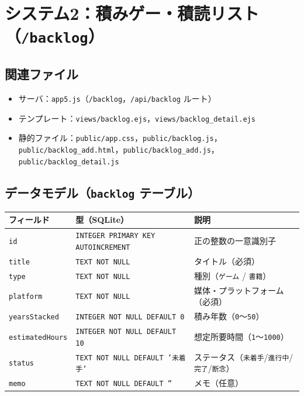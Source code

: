 \documentclass[
  a4paper,
  fontsize=11pt,
  line_length=40zw,
  number_of_lines=35,
  baselineskip=1.7zw
]{jlreq}
\begin{document}
\section{システム2：積みゲー・積読リスト（\texttt{/backlog}）}

\subsection{関連ファイル}
\begin{itemize}
  \item サーバ：\texttt{app5.js}（\texttt{/backlog}，\texttt{/api/backlog} ルート）
  \item テンプレート：\texttt{views/backlog.ejs}，\texttt{views/backlog\_detail.ejs}
  \item 静的ファイル：\texttt{public/app.css}，\texttt{public/backlog.js}，
    \texttt{public/backlog\_add.html}，\texttt{public/backlog\_add.js}，\texttt{public/backlog\_detail.js}
\end{itemize}

\subsection{データモデル（\texttt{backlog} テーブル）}
\begin{table}[htbp]
  \centering
  \small
  \begin{tabularx}{\textwidth}{llX}
    \toprule
    フィールド & 型（SQLite） & 説明 \\
    \midrule
    \texttt{id} & \texttt{INTEGER PRIMARY KEY AUTOINCREMENT} & 正の整数の一意識別子 \\
    \texttt{title} & \texttt{TEXT NOT NULL} & タイトル（必須） \\
    \texttt{type} & \texttt{TEXT NOT NULL} & 種別（\texttt{ゲーム} / \texttt{書籍}） \\
    \texttt{platform} & \texttt{TEXT NOT NULL} & 媒体・プラットフォーム（必須） \\
    \texttt{yearsStacked} & \texttt{INTEGER NOT NULL DEFAULT 0} & 積み年数（\texttt{0}〜\texttt{50}） \\
    \texttt{estimatedHours} & \texttt{INTEGER NOT NULL DEFAULT 10} & 想定所要時間（\texttt{1}〜\texttt{1000}） \\
    \texttt{status} & \texttt{TEXT NOT NULL DEFAULT '未着手'} & ステータス（\texttt{未着手}/\texttt{進行中}/\texttt{完了}/\texttt{断念}） \\
    \texttt{memo} & \texttt{TEXT NOT NULL DEFAULT ''} & メモ（任意） \\
    \bottomrule
  \end{tabularx}
\end{table}
\end{document}
